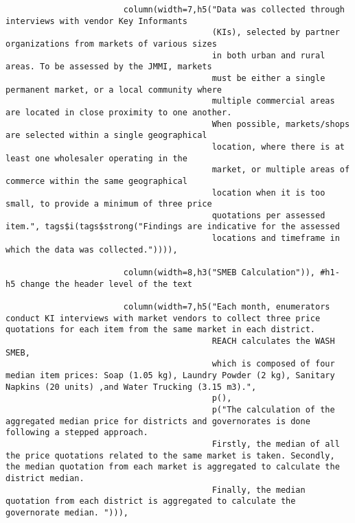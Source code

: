 \documentclass[
]{article}
\begin{document}
\begin{verbatim}
                        column(width=7,h5("Data was collected through interviews with vendor Key Informants 
                                          (KIs), selected by partner organizations from markets of various sizes 
                                          in both urban and rural areas. To be assessed by the JMMI, markets 
                                          must be either a single permanent market, or a local community where 
                                          multiple commercial areas are located in close proximity to one another. 
                                          When possible, markets/shops are selected within a single geographical 
                                          location, where there is at least one wholesaler operating in the 
                                          market, or multiple areas of commerce within the same geographical 
                                          location when it is too small, to provide a minimum of three price 
                                          quotations per assessed item.", tags$i(tags$strong("Findings are indicative for the assessed 
                                          locations and timeframe in which the data was collected.")))),
                               
                        column(width=8,h3("SMEB Calculation")), #h1- h5 change the header level of the text
                               
                        column(width=7,h5("Each month, enumerators conduct KI interviews with market vendors to collect three price quotations for each item from the same market in each district. 
                                          REACH calculates the WASH SMEB,
                                          which is composed of four median item prices: Soap (1.05 kg), Laundry Powder (2 kg), Sanitary Napkins (20 units) ,and Water Trucking (3.15 m3).",
                                          p(),
                                          p("The calculation of the aggregated median price for districts and governorates is done following a stepped approach. 
                                          Firstly, the median of all the price quotations related to the same market is taken. Secondly, the median quotation from each market is aggregated to calculate the district median. 
                                          Finally, the median quotation from each district is aggregated to calculate the governorate median. "))),
                               

\end{verbatim}
\end{document}
